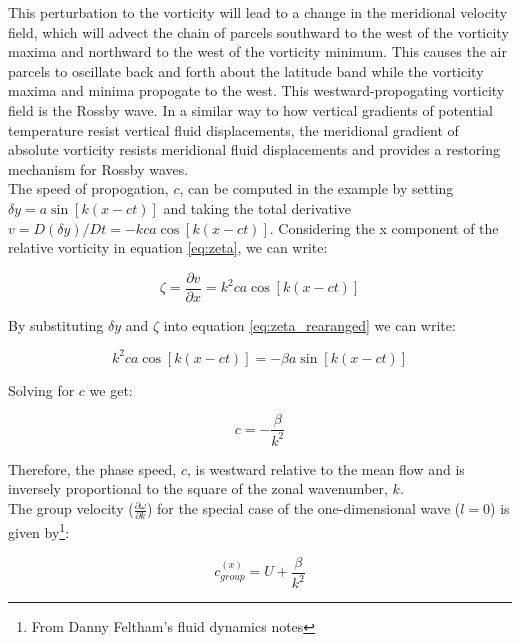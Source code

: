 \documentclass{article}
\begin{document}

This perturbation to the vorticity will lead to a change in the meridional velocity field, which will advect the chain of parcels southward to the west of the vorticity maxima and northward to the west of the vorticity minimum. This causes the air parcels to oscillate back and forth about the latitude band while the vorticity maxima and minima propogate to the west. This westward-propogating vorticity field is the Rossby wave. In a similar way to how vertical gradients of potential temperature resist vertical fluid displacements, the meridional gradient of absolute vorticity resists meridional fluid displacements and provides a restoring mechanism for Rossby waves.\\

The speed of propogation, $c$, can be computed in the example by setting $\delta y = a \sin[k(x - ct)]$ and taking the total derivative $v = D(\delta y)/Dt = -kca \cos[k(x - ct)]$. Considering the x component of the relative vorticity in equation \ref{eq:zeta}, we can write:

\begin{equation}
    \zeta  = \frac{\partial v}{\partial x} = k^2 ca \cos[k(x - ct)]
    \label{eq:zeta_x}
\end{equation}

By substituting $\delta y$ and $\zeta$ into equation \ref*{eq:zeta_rearanged} we can write:

\begin{equation}
    k^2 ca \cos[k(x - ct)] = -\beta a \sin[k(x - ct)]
    \label{eq:zeta_x_substitution}
\end{equation}

Solving for $c$ we get:

\begin{equation}
    c = -\frac{\beta}{k^2}
    \label{eq:zeta_x_substitution_c}
\end{equation}

Therefore, the phase speed, $c$, is westward relative to the mean flow and is inversely proportional to the square of the zonal wavenumber, $k$.\\
 
The group velocity ($\frac{\partial \omega} {\partial k}$) for the special case of the one-dimensional wave ($l=0$) is given by\footnote[2]{From Danny Feltham's fluid dynamics notes}:

\begin{equation}
    c^{(x)}_{group} = U + \frac{\beta}{k^2}
    \label{eq:group_velocity}
\end{equation}
\end{document}
